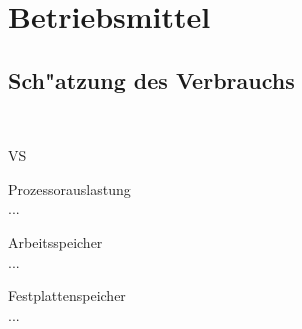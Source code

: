 %
%


\chapter{Betriebsmittel}
\label{BM}


\section{Sch{"a}tzung des Verbrauchs}
\label{BM:Verbrauch}

~\\

\begin{ids}{\gls{VS}}

	\id[10] Prozessorauslastung \hfill\\
	
	...
	
	\id[20] Arbeitsspeicher \hfill\\
	
	...
	
	\id[30] Festplattenspeicher \hfill\\
		
	...

\end{ids}


